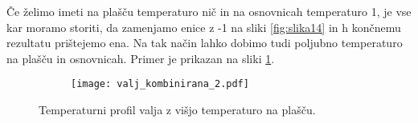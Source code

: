 \documentclass[12pt,a4paper]{article}
\begin{document}
Če želimo imeti na plašču temperaturo nič in na osnovnicah temperaturo 1, je vse kar moramo storiti, da zamenjamo enice z -1 na sliki \ref{fig:slika14} in h končnemu rezultatu prištejemo ena. Na tak način lahko dobimo tudi poljubno temperaturo na plašču in osnovnicah. Primer je prikazan na sliki \ref{fig:slika17}.

\begin{figure}[H]
    \centering
    \begin{subfigure}[b]{0.5\textwidth}  			
        \texttt{[image: valj\_kombinirana\_2.pdf]}
    \end{subfigure}
    \caption{Temperaturni profil valja z višjo temperaturo na plašču.} \label{fig:slika17}
\end{figure}
\end{document}
